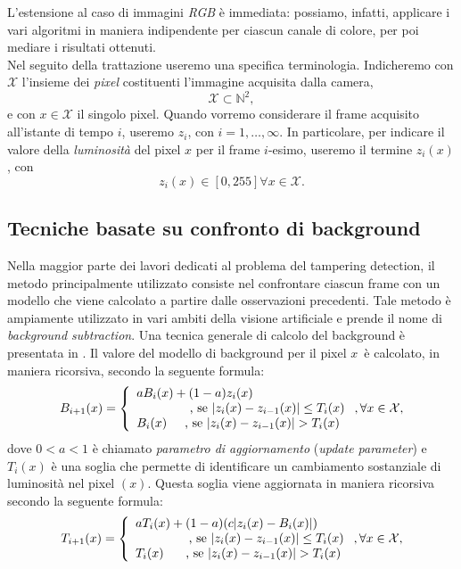L'estensione al caso di immagini \textit{RGB} \`e immediata: possiamo, infatti, applicare i vari algoritmi in maniera indipendente per ciascun canale di colore, per poi mediare i risultati ottenuti.\\
Nel seguito della trattazione useremo una specifica terminologia.
Indicheremo con $\mathcal{X}$ l'insieme dei \textit{pixel} costituenti l'immagine acquisita dalla camera,
\[ \mathcal{X} \subset \mathbb{N}^2, \]
e con $x \in \mathcal{X}$ il singolo pixel.
Quando vorremo considerare il frame acquisito all'istante di tempo $i$, useremo $z_i$, con $i=1,\dots , \infty$. 
In particolare, per indicare il valore della \textit{luminosit\`a} del pixel $x$ per il frame $i$-esimo, useremo il termine $z_i(x)$, con 
\[ z_i(x) \in [0, 255] \forall x \in \mathcal{X}. \]


\subsection{Tecniche basate su confronto di background}
\label{background}
Nella maggior parte dei lavori dedicati al problema del tampering detection, il metodo principalmente utilizzato consiste nel confrontare ciascun frame con un modello che viene calcolato a partire dalle osservazioni precedenti.
Tale metodo \`e ampiamente utilizzato in vari ambiti della visione artificiale e prende il nome di \textit{background subtraction}.
Una tecnica generale di calcolo del background \`e presentata in \cite{aksay2007camera}.
Il valore del modello di background per il pixel $x$\ \`e calcolato, in maniera ricorsiva, secondo la seguente formula:
\[
\label{eq:background}
B_{i + 1}(x)=\left\{ \begin{array} {lcl}
aB_i(x)+ (1-a)z_i(x) \\
\mbox{\hspace{1.5cm}, se } |z_i(x) - z_{i-1}(x)|\leq T_i(x) \\
B_i(x) \mbox{\hspace{0.5cm}, se } |z_i(x) - z_{i-1}(x)|>T_i(x)\end{array} \right. , \forall x \in \mathcal{X},
\]
dove $0 < a < 1$ \`e chiamato \textit{parametro di aggiornamento} (\textit{update parameter}) e $T_i(x)$ \`e una soglia che permette di identificare un cambiamento sostanziale di luminosit\`a nel pixel $(x)$. 
 Questa soglia viene aggiornata in maniera ricorsiva secondo la seguente formula:
  \[
  \label{eq:backgroundThreshUpd}
  T_{i + 1}(x)=\left\{ \begin{array} {lcl}
  aT_i(x)+ (1-a)(c |z_i(x) - B_i(x)|) \\
  \mbox{\hspace{1.5cm}, se	}  |z_i(x) - z_{i-1}(x)|\leq T_i(x) \\
  T_i(x) \mbox{	\hspace{0.5cm}, se	}  |z_i(x) - z_{i-1}(x)|>T_i(x) \end{array} \right. ,\forall x \in \mathcal{X},
  \]
